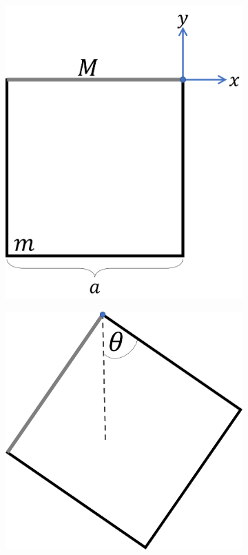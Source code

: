 \documentclass[letterpaper,11pt]{article}
\begin{document}
\begin{enumerate}
\begin{figure}[H]
    \centering
    \begin{subfigure}[t]{0.4\linewidth}
        \centering
        \includegraphics[width=0.7\linewidth]{2022-2/Imagenes/Capsula2/fierro_a.png}
        \caption{}
    \end{subfigure}
    \hspace{3em}
    \begin{subfigure}[t]{0.4\linewidth}
        \centering
        \includegraphics[width=0.7\linewidth]{2022-2/Imagenes/Capsula2/fierro_b.png}
        \caption{}
    \end{subfigure}
\end{figure}




%   

\end{enumerate}
\end{document}
